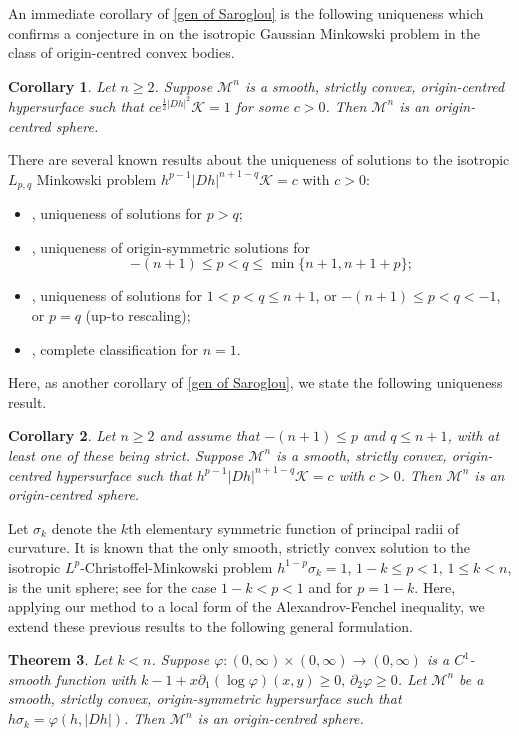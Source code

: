 \documentclass[12pt]{amsart}
\newtheorem{theorem}{Theorem}[section]
\newtheorem{corollary}[theorem]{Corollary}
\theoremstyle{definition}
\numberwithin{equation}{section}
\newcommand{\M}{\mathcal{M}}
\theoremstyle{remark}
\numberwithin{equation}{section}
\begin{document}
An immediate corollary of \autoref{gen of Saroglou} is the following uniqueness which confirms a conjecture in \cite{CHLZ23} on the isotropic Gaussian Minkowski problem in the class of origin-centred convex bodies.

\begin{corollary}
Let $n\geq 2$. Suppose $\M^n$ is a smooth, strictly convex, origin-centred hypersurface such that $c e^{\frac{1}{2}|Dh|^2}\mathcal{K}=1$ for some $c>0$. Then $\M^n$ is an origin-centred sphere.
\end{corollary}

There are several known results about the uniqueness of solutions to the isotropic $L_{p,q}$ Minkowski problem $h^{p-1} |Dh|^{n+1-q}\mathcal{K}=c$ with $c>0$:
\begin{itemize}
\item \cite{HZ18}, uniqueness of solutions for $p>q$;
\item \cite{CHZ19}, uniqueness of origin-symmetric solutions for \[-(n+1)\leq p<q\leq \min \{n+1,n+1+p\} ;\]
\item \cite{CL21}, uniqueness of solutions for $1<p<q\leq n+1$, or $-(n+1)\leq p<q<-1$, or $p=q$ (up-to rescaling);
\item \cite{LW22}, complete classification for $n=1$.
\end{itemize}

Here, as another corollary of \autoref{gen of Saroglou}, we state the following uniqueness result. 
\begin{corollary} Let $n\geq 2$ and assume that $-(n+1)\leq p$ and $q\leq n+1$, with at least one of these being strict. 
	 Suppose $\M^n$ is a smooth, strictly convex, origin-centred hypersurface such that  $h^{p-1} |Dh|^{n+1-q}\mathcal{K}=c$ with $c>0$. Then $\M^n$ is an origin-centred sphere. 
\end{corollary}


Let $\sigma_k$ denote the $k$th elementary symmetric function of principal radii of curvature. It is known that the only smooth, strictly convex solution to the isotropic $L^p$-Christoffel-Minkowski problem $h^{1-p}\sigma_k=1$, $1-k \leq p<1,\, 1\leq k<n$, is the unit sphere; see \cite{Che20}  for the case $1-k<p<1$ and \cite{McC11} for $p=1-k$. Here, applying our method to a local form of the Alexandrov-Fenchel inequality, we extend these previous results to the following general formulation.

\begin{theorem}\label{sigma k soliton}
Let $k<n$. Suppose $\varphi: (0,\infty)\times (0,\infty)\to (0,\infty)$ is a $C^1$-smooth function with $k-1+x\partial_1(\log\varphi)(x,y)\geq 0,\,\partial_2\varphi\geq 0$.  Let $\M^n$ be a smooth, strictly convex, origin-symmetric hypersurface such that  $h\sigma_k=\varphi(h,|Dh|)$. Then $\M^n$ is an origin-centred sphere.
\end{theorem}
\end{document}
